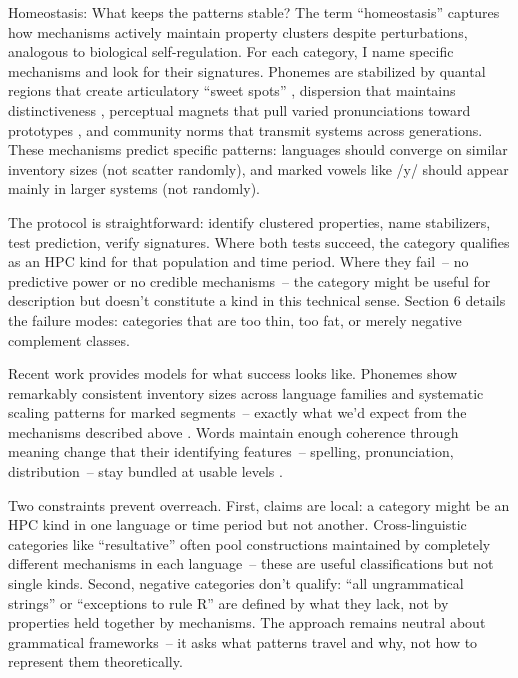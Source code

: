 \documentclass[12pt]{article}
\begin{document}
Homeostasis: What keeps the patterns stable? The term \enquote{homeostasis} captures how mechanisms actively maintain property clusters despite perturbations, analogous to biological self-regulation. For each category, I name specific mechanisms and look for their signatures. Phonemes are stabilized by quantal regions that create articulatory \enquote{sweet spots} \citep{Stevens1989Quantal}, dispersion that maintains distinctiveness \citep{LiljencrantsLindblom1972}, perceptual magnets that pull varied pronunciations toward prototypes \citep{KuhlEtAl1991}, and community norms that transmit systems across generations. These mechanisms predict specific patterns: languages should converge on similar inventory sizes (not scatter randomly), and marked vowels like /y/ should appear mainly in larger systems (not randomly).

The protocol is straightforward: identify clustered properties, name stabilizers, test prediction, verify signatures. Where both tests succeed, the category qualifies as an HPC kind for that population and time period. Where they fail~-- no predictive power or no credible mechanisms~-- the category might be useful for description but doesn't constitute a kind in this technical sense. Section 6 details the failure modes: categories that are too thin, too fat, or merely negative complement classes.

Recent work provides models for what success looks like. Phonemes show remarkably consistent inventory sizes across language families and systematic scaling patterns for marked segments~-- exactly what we'd expect from the mechanisms described above \citep{Ekstrom2025PhonemeTool}. Words maintain enough coherence through meaning change that their identifying features~-- spelling, pronunciation, distribution~-- stay bundled at usable levels \citep{Miller2021WordsSpeciesKinds}.

Two constraints prevent overreach. First, claims are local: a category might be an HPC kind in one language or time period but not another. Cross-linguistic categories like \enquote{resultative} often pool constructions maintained by completely different mechanisms in each language~-- these are useful classifications but not single kinds. Second, negative categories don't qualify: \enquote{all ungrammatical strings} or \enquote{exceptions to rule R} are defined by what they lack, not by properties held together by mechanisms. The approach remains neutral about grammatical frameworks~-- it asks what patterns travel and why, not how to represent them theoretically.
\end{document}
